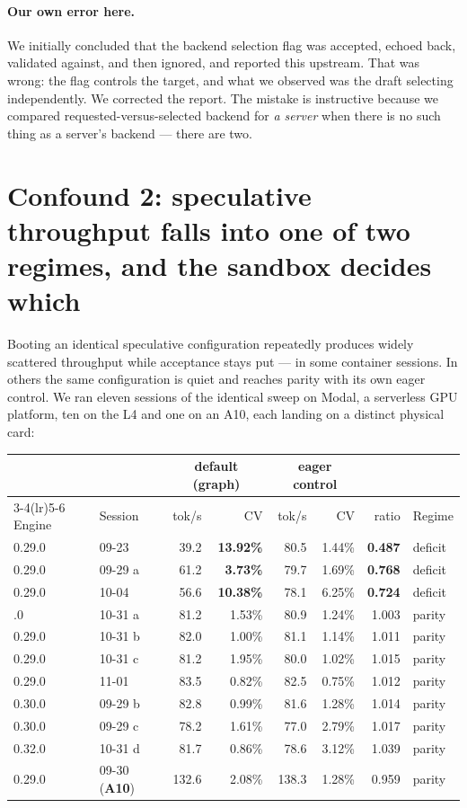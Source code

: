 \documentclass[11pt]{article}
\begin{document}
\paragraph{Our own error here.} We initially concluded that the backend
selection flag was accepted, echoed back, validated against, and then
ignored, and reported this upstream. That was wrong: the flag controls the
target, and what we observed was the draft selecting independently. We
corrected the report. The mistake is instructive because we compared
requested-versus-selected backend for \emph{a server} when there is no such
thing as a server's backend --- there are two.

\section{Confound 2: speculative throughput falls into one of two
regimes, and the sandbox decides which}\label{sec:c2}

Booting an identical speculative configuration repeatedly produces widely
scattered throughput while acceptance stays put --- in some container
sessions. In others the same configuration is quiet and reaches parity with
its own eager control. We ran eleven sessions of the identical sweep on
Modal, a serverless GPU platform, ten on the L4 and one on an A10, each
landing on a distinct physical card:

\begin{center}\small
\begin{tabular}{llrrrrrl}
\toprule
 & & \multicolumn{2}{c}{default (graph)} & \multicolumn{2}{c}{eager control} & &\\
\cmidrule(lr){3-4}\cmidrule(lr){5-6}
Engine & Session & tok/s & CV & tok/s & CV & ratio & Regime\\
\midrule
0.29.0 & 09-23 & 39.2 & \textbf{13.92\%} & 80.5 & 1.44\% & \textbf{0.487} & deficit\\
0.29.0 & 09-29 a & 61.2 & \textbf{3.73\%} & 79.7 & 1.69\% & \textbf{0.768} & deficit\\
0.29.0 & 10-04 & 56.6 & \textbf{10.38\%} & 78.1 & 6.25\% & \textbf{0.724} & deficit\\
\addlinespace
0.29.0 & 10-31 a & 81.2 & 1.53\% & 80.9 & 1.24\% & 1.003 & parity\\
0.29.0 & 10-31 b & 82.0 & 1.00\% & 81.1 & 1.14\% & 1.011 & parity\\
0.29.0 & 10-31 c & 81.2 & 1.95\% & 80.0 & 1.02\% & 1.015 & parity\\
0.29.0 & 11-01 & 83.5 & 0.82\% & 82.5 & 0.75\% & 1.012 & parity\\
0.30.0 & 09-29 b & 82.8 & 0.99\% & 81.6 & 1.28\% & 1.014 & parity\\
0.30.0 & 09-29 c & 78.2 & 1.61\% & 77.0 & 2.79\% & 1.017 & parity\\
0.32.0 & 10-31 d & 81.7 & 0.86\% & 78.6 & 3.12\% & 1.039 & parity\\
\midrule
0.29.0 & 09-30 (\textbf{A10}) & 132.6 & 2.08\% & 138.3 & 1.28\% & 0.959 & parity\\
\bottomrule
\end{tabular}
\end{center}
\end{document}
